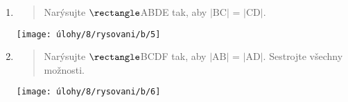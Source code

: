 \begin{enumerate}
    \item
    \begin{minipage}[t]{\linewidth}
        \begin{quote}
            Narýsujte $\rectangle$ABDE tak, aby $\lvert \text{BC} \rvert$ = $\lvert \text{CD} \rvert$.
        \end{quote}
        \centering
        \texttt{[image: úlohy/8/rysovani/b/5]}

    \end{minipage}

    \item
    \begin{minipage}[t]{\linewidth}
        \begin{quote}
            Narýsujte $\rectangle$BCDF tak, aby $\lvert \text{AB} \rvert$ = $\lvert \text{AD} \rvert$.
            Sestrojte všechny možnosti.
        \end{quote}
        \centering
        \texttt{[image: úlohy/8/rysovani/b/6]}

    \end{minipage}
\end{enumerate}


\newpage

